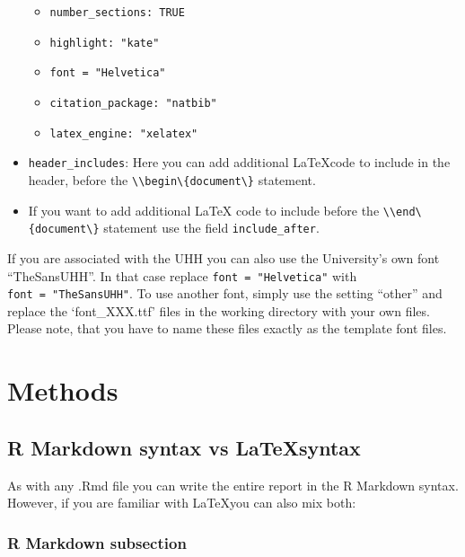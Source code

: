 \documentclass[
11pt,
a4paper]{article}
\providecommand{\tightlist}{%
  \setlength{\itemsep}{0pt}\setlength{\parskip}{0pt}}
\begin{document}
\begin{itemize}
  \begin{itemize}
  \tightlist
  \item
    \texttt{number\_sections:\ TRUE}
  \item
    \texttt{highlight:\ "kate"}
  \item
    \texttt{font\ =\ "Helvetica"}
  \item
    \texttt{citation\_package:\ "natbib"}
  \item
    \texttt{latex\_engine:\ "xelatex"}
  \end{itemize}
\item
  \texttt{header\_includes}: Here you can add additional \LaTeX code to
  include in the header, before the
  \texttt{\textbackslash{}\textbackslash{}begin\textbackslash{}\{document\textbackslash{}\}}
  statement.
\item
  If you want to add additional LaTeX code to include before the
  \texttt{\textbackslash{}\textbackslash{}end\textbackslash{}\{document\textbackslash{}\}}
  statement use the field \texttt{include\_after}.
\end{itemize}

If you are associated with the UHH you can also use the University's own
font ``TheSansUHH''. In that case replace \texttt{font\ =\ "Helvetica"}
with \texttt{font\ =\ "TheSansUHH"}. To use another font, simply use the
setting ``other'' and replace the `font\_XXX.ttf' files in the working
directory with your own files. Please note, that you have to name these
files exactly as the template font files.

\hypertarget{methods}{%
\section{Methods}\label{methods}}

\hypertarget{r-markdown-syntax-vs-syntax}{%
\subsection{\texorpdfstring{R Markdown syntax vs
\LaTeX syntax}{R Markdown syntax vs syntax}}\label{r-markdown-syntax-vs-syntax}}

As with any .Rmd file you can write the entire report in the R Markdown
syntax. However, if you are familiar with \LaTeX you can also mix both:

\hypertarget{r-markdown-subsection}{%
\subsubsection{R Markdown subsection}\label{r-markdown-subsection}}
\end{document}
